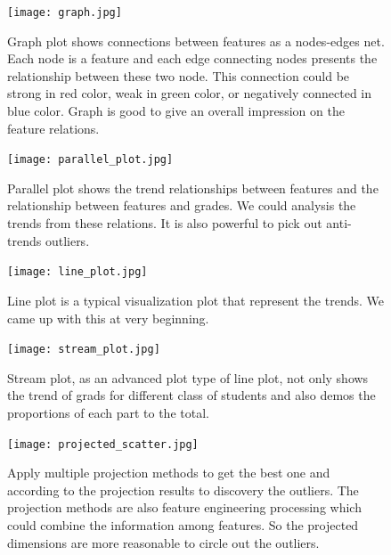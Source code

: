 \documentclass{article}
\begin{document}
\begin{figure}[H]
\centering
\texttt{[image: graph.jpg]}
\caption{Graph plot shows connections between features as a nodes-edges net. Each node is a feature and each edge connecting nodes presents the relationship between these two node. This connection could be strong in red color, weak in green color, or negatively connected in blue color. Graph is good to give an overall impression on the feature relations.}
\end{figure}

\begin{figure}[H]
\centering
\texttt{[image: parallel\_plot.jpg]}
\caption{Parallel plot shows the trend relationships between features and the relationship between features and grades. We could analysis the trends from these relations. It is also powerful to pick out anti-trends outliers.}
\end{figure}

\begin{figure}[H]
\centering
\texttt{[image: line\_plot.jpg]}
\caption{Line plot is a typical visualization plot that represent the trends. We came up with this at very beginning.}
\end{figure}

\begin{figure}[H]
\centering
\texttt{[image: stream\_plot.jpg]}
\caption{Stream plot, as an advanced plot type of line plot, not only shows the trend of grads for different class of students and also demos the proportions of each part to the total.}
\end{figure}

\begin{figure}[H]
\centering
\texttt{[image: projected\_scatter.jpg]}
\caption{Apply multiple projection methods to get the best one and according to the projection results to discovery the outliers. The projection methods are also feature engineering processing which could combine the information among features. So the projected dimensions are more reasonable to circle out the outliers.}
\end{figure}
\end{document}
